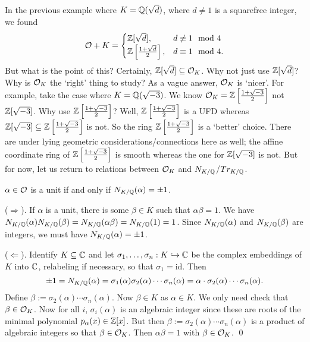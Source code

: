 In the previous example where $K=\mathbb{Q}(\sqrt{d})$, where $d \neq 1$ is a squarefree integer, we found
	\[
	\mathcal{O}+K=
	\begin{cases}
	\mathbb{Z}[\sqrt{d}], & d \not\equiv 1 \mod 4 \\
	\mathbb{Z}\left[\frac{1+\sqrt{d}}{2}\right], & d \equiv 1 \mod 4.
	\end{cases}
	\]
But what is the point of this? Certainly, $\mathbb{Z}[\sqrt{d}] \subseteq \mathcal{O}_K$. Why not just use $\mathbb{Z}[\sqrt{d}]$? Why is $\mathcal{O}_K$ the `right' thing to study? As a vague answer, $\mathcal{O}_K$ is `nicer'. For example, take the case where $K=\mathbb{Q}(\sqrt{-3})$. We know $\mathcal{O}_K=\mathbb{Z}\left[\frac{1+\sqrt{-3}}{2}\right]$ not $\mathbb{Z}[\sqrt{-3}]$. Why use $\mathbb{Z}\left[\frac{1+\sqrt{-3}}{2}\right]$? Well, $\mathbb{Z}\left[\frac{1+\sqrt{-3}}{2}\right]$ is a UFD whereas $\mathbb{Z}[\sqrt{-3}] \subseteq \mathbb{Z}\left[\frac{1+\sqrt{-3}}{2}\right]$ is not. So the ring $\mathbb{Z}\left[\frac{1+\sqrt{-3}}{2}\right]$ is a `better' choice. There are under lying geometric considerations/connections here as well; the affine coordinate ring of $\mathbb{Z}\left[\frac{1+\sqrt{-3}}{2}\right]$ is smooth whereas the one for $\mathbb{Z}[\sqrt{-3}]$ is not. But for now, let us return to relations between $\mathcal{O}_K$ and $N_{K/\mathbb{Q}}$/$Tr_{K/\mathbb{Q}}$. 

\begin{prop}
$\alpha \in \mathcal{O}$ is a unit if and only if $N_{K/\mathbb{Q}}(\alpha)=\pm 1$.
\end{prop}

\pf ($\Longrightarrow$). If $\alpha$ is a unit, there is some $\beta \in K$ such that $\alpha \beta=1$. We have $N_{K/\mathbb{Q}}(\alpha)N_{K/\mathbb{Q}}(\beta)=N_{K/\mathbb{Q}}(\alpha\beta)=N_{K/\mathbb{Q}}(1)=1$. Since $N_{K/\mathbb{Q}}(\alpha)$ and $N_{K/\mathbb{Q}}(\beta)$ are integers, we must have $N_{K/\mathbb{Q}}(\alpha)=\pm 1$. 

($\Longleftarrow$). Identify $K \subseteq \mathbb{C}$ and let $\sigma_1,\ldots,\sigma_n: K \hookrightarrow \mathbb{C}$ be the complex embeddings of $K$ into $\mathbb{C}$, relabeling if necessary, so that $\sigma_1=\text{id}$. Then
	\[
	\pm 1=N_{K/\mathbb{Q}}(\alpha)=\sigma_1(\alpha)\sigma_2(\alpha) \cdots \sigma_n(\alpha)= \alpha \cdot \sigma_2(\alpha) \cdots \sigma_n(\alpha).
	\]
Define $\beta:=\sigma_2(\alpha) \cdots \sigma_n(\alpha)$. Now $\beta \in K$ as $\alpha \in K$. We only need check that $\beta \in \mathcal{O}_K$. Now for all $i$, $\sigma_i(\alpha)$ is an algebraic integer since these are roots of the minimal polynomial $p_\alpha(x) \in \mathbb{Z}[x]$. But then $\beta:=\sigma_2(\alpha) \cdots \sigma_n(\alpha)$ is a product of algebraic integers so that $\beta \in \mathcal{O}_K$. Then $\alpha\beta=1$ with $\beta \in \mathcal{O}_K$. \qed 


